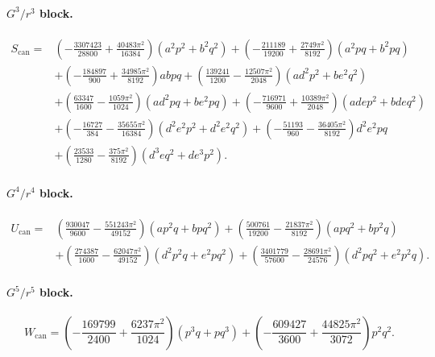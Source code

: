 \documentclass[11pt]{article}
\begin{document}
\paragraph{$G^3/r^3$ block.}
\begin{equation}
\begin{aligned}
S_{\mathrm{can}}={}&
\left(-\frac{3307423}{28800}+\frac{40483\pi^2}{16384}\right)(a^2p^2+b^2q^2)
+\left(-\frac{211189}{19200}+\frac{2749\pi^2}{8192}\right)(a^2pq+b^2pq)
\\
&+\left(-\frac{184897}{900}+\frac{34985\pi^2}{8192}\right)abpq
+\left(\frac{139241}{1200}-\frac{12507\pi^2}{2048}\right)(ad^2p^2+be^2q^2)
\\
&+\left(\frac{63347}{1600}-\frac{1059\pi^2}{1024}\right)(ad^2pq+be^2pq)
+\left(-\frac{716971}{9600}+\frac{10389\pi^2}{2048}\right)(adep^2+bdeq^2)
\\
&+\left(-\frac{16727}{384}-\frac{35655\pi^2}{16384}\right)(d^2e^2p^2+d^2e^2q^2)
+\left(-\frac{51193}{960}-\frac{36405\pi^2}{8192}\right)d^2e^2pq
\\
&+\left(\frac{23533}{1280}-\frac{375\pi^2}{8192}\right)(d^3eq^2+de^3p^2).
\end{aligned}
\label{eq:app-canonical-slice-Scan}
\end{equation}

\paragraph{$G^4/r^4$ block.}
\begin{equation}
\begin{aligned}
U_{\mathrm{can}}={}&
\left(\frac{930047}{9600}-\frac{551243\pi^2}{49152}\right)(ap^2q+bpq^2)
+\left(\frac{500761}{19200}-\frac{21837\pi^2}{8192}\right)(apq^2+bp^2q)
\\
&+\left(\frac{274387}{1600}-\frac{62047\pi^2}{49152}\right)(d^2p^2q+e^2pq^2)
+\left(\frac{3401779}{57600}-\frac{28691\pi^2}{24576}\right)(d^2pq^2+e^2p^2q).
\end{aligned}
\label{eq:app-canonical-slice-Ucan}
\end{equation}

\paragraph{$G^5/r^5$ block.}
\begin{equation}
W_{\mathrm{can}}=
\left(-\frac{169799}{2400}+\frac{6237\pi^2}{1024}\right)(p^3q+pq^3)
+\left(-\frac{609427}{3600}+\frac{44825\pi^2}{3072}\right)p^2q^2.
\label{eq:app-canonical-slice-Wcan}
\end{equation}
\end{document}
